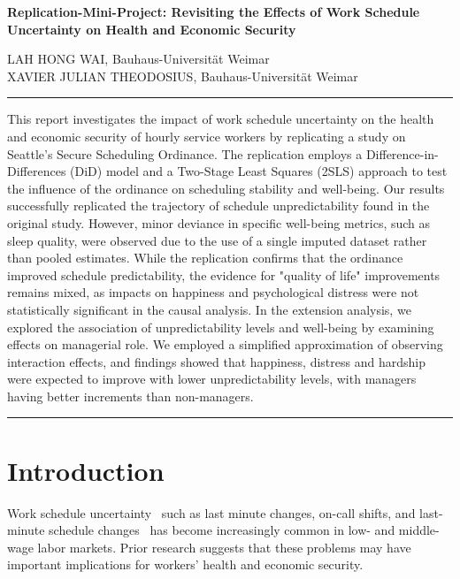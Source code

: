\documentclass{article}
\begin{document}
	
	
	\begin{flushleft}
	{\LARGE \textbf{Replication-Mini-Project: Revisiting the Effects of Work Schedule Uncertainty on Health and Economic Security}} \\
	
	\vspace{20pt}
	
	\uppercase{Lah Hong Wai}, Bauhaus-Universität Weimar \\
	\uppercase{Xavier Julian Theodosius}, Bauhaus-Universität Weimar
	\end{flushleft}
	
	
	\vspace{20pt}
	\hrule
	
	This report investigates the impact of work schedule uncertainty on the health and economic security of hourly service workers by replicating a study on Seattle's Secure Scheduling Ordinance. The replication employs a Difference-in-Differences (DiD) model and a Two-Stage Least Squares (2SLS) approach to test the influence of the ordinance on scheduling stability and well-being. Our results successfully replicated the trajectory of schedule unpredictability found in the original study. However, minor deviance in specific well-being metrics, such as sleep quality, were observed due to the use of a single imputed dataset rather than pooled estimates. While the replication confirms that the ordinance improved schedule predictability, the evidence for "quality of life" improvements remains mixed, as impacts on happiness and psychological distress were not statistically significant in the causal analysis. In the extension analysis, we explored the association of unpredictability levels and well-being by examining effects on managerial role. We employed a simplified approximation of observing interaction effects, and findings showed that happiness, distress and hardship were expected to improve with lower unpredictability levels, with managers having better increments than non-managers.
	
	\vspace{5pt}
	\hrule
	
	\section{Introduction}
	
	Work schedule uncertainty \textemdash~such as last minute changes, on-call shifts, and last-minute schedule changes \textemdash~has become increasingly common in low- and middle-wage labor markets. Prior research suggests that these problems may have important implications for workers’ health and economic security.
	
\end{document}
